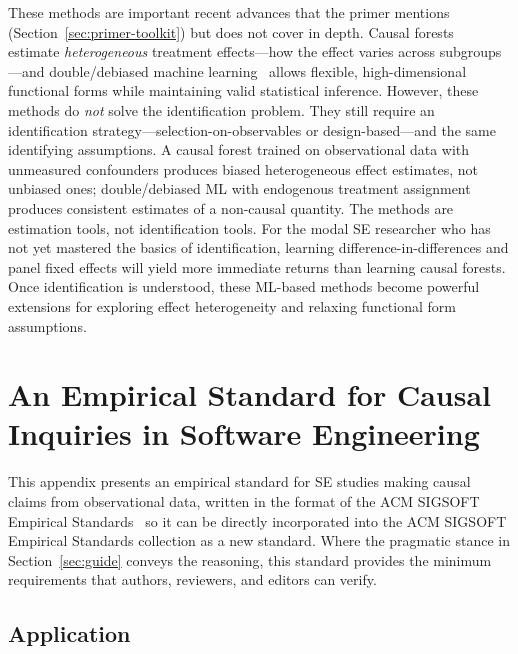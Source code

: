 These methods are important recent advances that the primer mentions (Section~\ref{sec:primer-toolkit}) but does not cover in depth.
Causal forests~\cite{athey2016recursive} estimate \emph{heterogeneous} treatment effects---how the effect varies across subgroups---and double/debiased machine learning~\cite{chernozhukov2018double} allows flexible, high-dimensional functional forms while maintaining valid statistical inference.
However, these methods do \emph{not} solve the identification problem.
They still require an identification strategy---selection-on-observables or design-based---and the same identifying assumptions.
A causal forest trained on observational data with unmeasured confounders produces biased heterogeneous effect estimates, not unbiased ones; double/debiased ML with endogenous treatment assignment produces consistent estimates of a non-causal quantity.
The methods are estimation tools, not identification tools.
For the modal SE researcher who has not yet mastered the basics of identification, learning difference-in-differences and panel fixed effects will yield more immediate returns than learning causal forests.
Once identification is understood, these ML-based methods become powerful extensions for exploring effect heterogeneity and relaxing functional form assumptions.

\section{An Empirical Standard for Causal Inquiries in Software Engineering}
\label{sec:appendix-standard}

This appendix presents an empirical standard for SE studies making causal claims from observational data, written in the format of the ACM SIGSOFT Empirical Standards~\cite{DBLP:journals/corr/abs-2010-03525} so it can be directly incorporated into the ACM SIGSOFT Empirical Standards collection as a new standard.
Where the pragmatic stance in Section~\ref{sec:guide} conveys the reasoning, this standard provides the minimum requirements that authors, reviewers, and editors can verify.

\subsection{Application}

